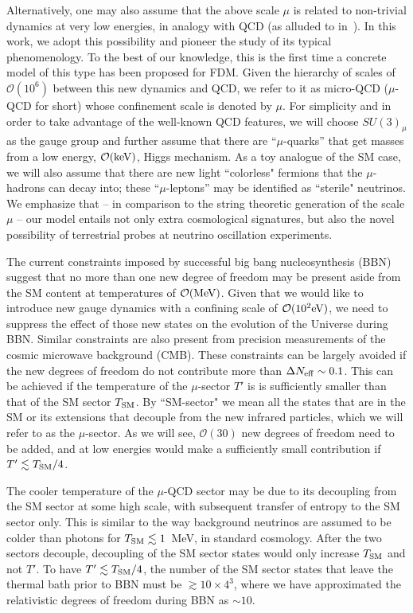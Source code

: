 \documentclass[twocolumn,preprintnumbers,
endnote,prl]{revtex4-1}
\newcommand{\lsim}{\lesssim}
\newcommand{\gsim}{\gtrsim}
\newcommand{\ord}[1]{\mathcal{O}{(#1)}}
\newcommand{\tsm}{T_{\rm SM}}
\begin{document}
Alternatively, one may also assume that the 
above scale $\mu$ is related to non-trivial dynamics at very low energies, 
in analogy with QCD (as alluded to in~\cite{Hui:2016ltb}).  
In this work, we adopt this 
possibility and pioneer the study of its typical phenomenology.  To the best of our knowledge,  this is the first time a concrete model of this type has been proposed for FDM. Given the hierarchy of scales 
of $\ord{10^6}$ between this new dynamics and 
QCD, we refer to it as micro-QCD ($\mu$-QCD for short) whose confinement scale is denoted by $\mu$.  For simplicity and 
in order to take advantage of the well-known QCD features, we will choose $SU(3)_\mu$ as the gauge group and further assume 
that there are ``$\mu$-quarks'' that get masses from a low energy, $\ord{\rm keV}$, Higgs mechanism.  As a toy analogue of the 
SM case, we will also assume that there are new light ``colorless" fermions that the $\mu$-hadrons can decay into; these ``$\mu$-leptons'' may be identified as ``sterile" neutrinos. We emphasize that -- in comparison to the string theoretic generation of the scale $\mu$ -- our model entails not only extra cosmological signatures, but also the novel possibility of terrestrial probes at neutrino oscillation experiments.

The current constraints imposed by successful big bang nucleosynthesis (BBN) suggest that no more than one 
new degree of freedom may be present aside from the SM content at temperatures of $\ord{\rm MeV}$.  Given that 
we would like to introduce new gauge dynamics with a confining scale of $\ord{\rm 10^2 eV}$, we need to suppress the effect of 
those new states on the evolution of the Universe during BBN.  Similar constraints are also present from precision 
measurements of the cosmic microwave background (CMB).  These constraints can be largely avoided if 
the new degrees of freedom do not contribute more than $\Delta N_{\rm eff} \sim 0.1$.  
This can be achieved if the temperature of the $\mu$-sector $T'$ is  
is sufficiently smaller than that of the SM sector $\tsm$. By ``SM-sector" we mean all 
the states that are in the SM or its extensions that decouple from the new infrared particles, which we will refer to as the $\mu$-sector. As we will see, $\ord{30}$ new degrees of freedom need to be added, and at low energies would make a sufficiently small contribution if $T'\lsim \tsm/4$. 

The cooler temperature of the $\mu$-QCD sector may be due to its decoupling from the SM sector at some high scale, 
with subsequent transfer of entropy to the SM sector only.  This is similar to the way background neutrinos are assumed to be 
colder than photons for $\tsm \lsim 1$~MeV, in standard cosmology.  After the two sectors decouple, decoupling of the 
SM sector states would only increase $\tsm$ and not $T'$.  To have $T'\lsim \tsm/4$, the 
number of the SM sector states that leave the thermal bath prior to BBN must be $\gsim 10 \times 4^3$, where we have approximated the relativistic degrees of freedom during BBN as $\sim 10$.   
\end{document}
